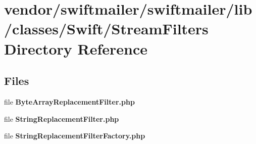 \section{vendor/swiftmailer/swiftmailer/lib/classes/\+Swift/\+Stream\+Filters Directory Reference}
\label{dir_ae7582d99d84e4b3e535d14b56c463c7}
\subsection*{Files}
\begin{DoxyCompactItemize}
\item 
file {\bf Byte\+Array\+Replacement\+Filter.\+php}
\item 
file {\bf String\+Replacement\+Filter.\+php}
\item 
file {\bf String\+Replacement\+Filter\+Factory.\+php}
\end{DoxyCompactItemize}
